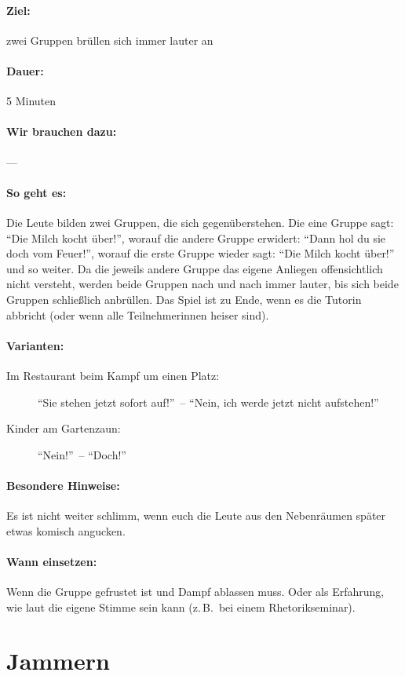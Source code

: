 \paragraph{Ziel:} zwei Gruppen brüllen sich immer lauter an
\paragraph{Dauer:} 5 Minuten
\paragraph{Wir brauchen dazu:} ---
\paragraph{So geht es:} Die Leute bilden zwei Gruppen, die sich gegenüberstehen. Die eine Gruppe sagt: "`Die Milch kocht über!"', worauf die andere Gruppe erwidert: "`Dann hol du sie doch vom Feuer!"', worauf die erste Gruppe wieder sagt: "`Die Milch kocht über!"' und so weiter. Da die jeweils andere Gruppe das eigene Anliegen offensichtlich nicht versteht, werden beide Gruppen nach und nach immer lauter, bis sich beide Gruppen schließlich anbrüllen. Das Spiel ist zu Ende, wenn es die Tutorin abbricht (oder wenn alle Teilnehmerinnen heiser sind).
\paragraph{Varianten:}
	\begin{description}
		\item[Im Restaurant beim Kampf um einen Platz:] "`Sie stehen jetzt sofort auf!"'~-- "`Nein, ich werde jetzt nicht aufstehen!"'
		\item[Kinder am Gartenzaun:] "`Nein!"'~-- "`Doch!"'
	\end{description}
\paragraph{Besondere Hinweise:} Es ist nicht weiter schlimm, wenn euch die Leute aus den Nebenräumen später etwas komisch angucken.
\paragraph{Wann einsetzen:} Wenn die Gruppe gefrustet ist und Dampf ablassen muss. Oder als Erfahrung, wie laut die eigene Stimme sein kann (z.\,B.~bei einem Rhetorikseminar).

\section{Jammern}
